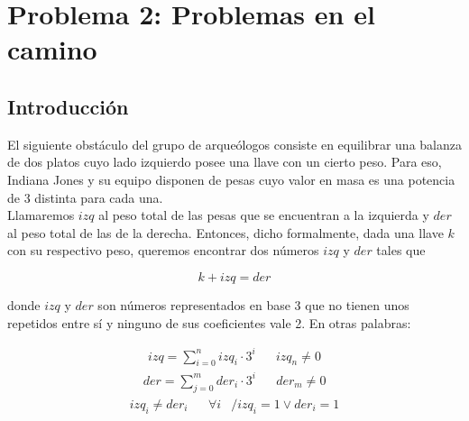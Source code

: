 \section{Problema 2: Problemas en el camino}

\subsection{Introducción}
	El siguiente obstáculo del grupo de arqueólogos consiste en equilibrar una balanza de dos platos cuyo lado izquierdo posee una llave con un cierto peso. Para eso, Indiana Jones y su equipo disponen de pesas cuyo valor en masa es una potencia de 3 distinta para cada una. \\
	Llamaremos $izq$ al peso total de las pesas que se encuentran a la izquierda y $der$ al peso total de las de la derecha.
	Entonces, dicho formalmente, dada una llave $k$ con su respectivo peso, queremos encontrar dos números $izq$ y $der$ tales que

	$$k + izq = der$$

	donde $izq$ y $der$ son números representados en base 3 que no tienen unos repetidos entre sí y ninguno de sus coeficientes vale 2. En otras palabras:

	
	\begin{align*}
	izq = \sum_{i=0}^n izq_i \cdot 3^i && izq_n \neq 0
	\end{align*}
	\begin{align*}
	der = \sum_{j=0}^m der_i \cdot 3^i && der_m \neq 0
	\end{align*}
	\begin{align*}
	izq_i \neq der_i && \forall i & / izq_i = 1 \lor der_i = 1
	\end{align*}